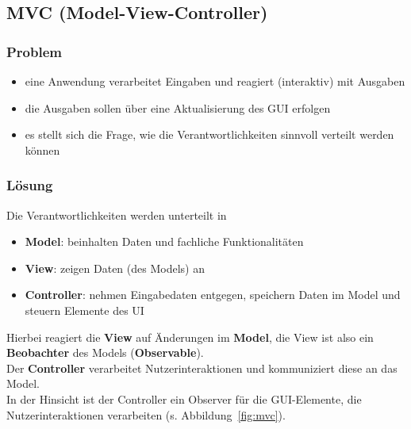 \subsection{MVC (Model-View-Controller)}

\subsubsection*{Problem}

\begin{itemize}
    \item eine Anwendung verarbeitet Eingaben und reagiert (interaktiv) mit Ausgaben
    \item die Ausgaben sollen über eine Aktualisierung des GUI erfolgen
    \item es stellt sich die Frage, wie die Verantwortlichkeiten sinnvoll verteilt werden können
\end{itemize}

\subsubsection*{Lösung}
Die Verantwortlichkeiten werden unterteilt in

\begin{itemize}
    \item \textbf{Model}: beinhalten Daten und fachliche Funktionalitäten
    \item \textbf{View}: zeigen Daten (des Models) an
    \item \textbf{Controller}: nehmen Eingabedaten entgegen, speichern Daten im Model und steuern Elemente des UI
\end{itemize}

\noindent
Hierbei reagiert die \textbf{View} auf Änderungen im \textbf{Model}, die View ist also ein \textbf{Beobachter} des Models (\textbf{Observable}).\\
Der \textbf{Controller} verarbeitet Nutzerinteraktionen und kommuniziert diese an das Model.\\
In der Hinsicht ist der Controller ein Observer für die GUI-Elemente, die Nutzerinteraktionen verarbeiten (s. Abbildung~\ref{fig:mvc}).

